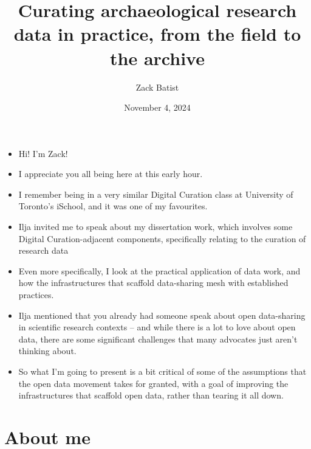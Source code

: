 \documentclass{article}
\title{Curating archaeological research data in practice, from the field to the archive}
\author{Zack Batist}
\date{November 4, 2024}
\begin{document}
\maketitle

\begin{itemize}
  \item Hi! I'm Zack!
  \item I appreciate you all being here at this early hour.
  \item I remember being in a very similar Digital Curation class at University of Toronto's iSchool, and it was one of my favourites.
  \item Ilja invited me to speak about my dissertation work, which involves some Digital Curation-adjacent components, specifically relating to the curation of research data
  \item Even more specifically, I look at the practical application of data work, and how the infrastructures that scaffold data-sharing mesh with established practices.
  \item Ilja mentioned that you already had someone speak about open data-sharing in scientific research contexts -- and while there is a lot to love about open data, there are some significant challenges that many advocates just aren't thinking about.
  \item So what I'm going to present is a bit critical of some of the assumptions that the open data movement takes for granted, with a goal of improving the infrastructures that scaffold open data, rather than tearing it all down.
\end{itemize}

\section{About me}
\end{document}

